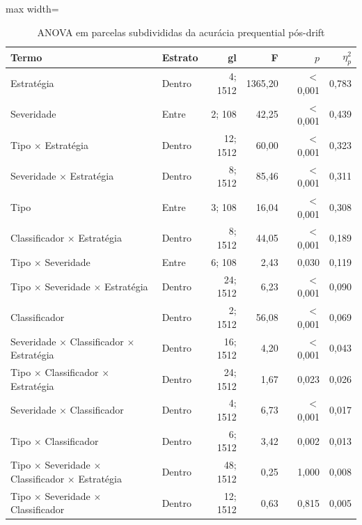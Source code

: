 \begin{table}[htbp]
\centering
\small
\caption{ANOVA em parcelas subdivididas da acurácia prequential pós-drift}
\label{tab:anova}
\begin{adjustbox}{max width=\textwidth}
\begin{tabular}{llrrrr}
\toprule
Termo & Estrato & gl & F & $p$ & $\eta^2_p$ \\
\midrule
Estratégia & Dentro & 4; 1512 & 1365,20 & $<$ 0,001 & 0,783 \\
Severidade & Entre & 2; 108 & 42,25 & $<$ 0,001 & 0,439 \\
Tipo $\times$ Estratégia & Dentro & 12; 1512 & 60,00 & $<$ 0,001 & 0,323 \\
Severidade $\times$ Estratégia & Dentro & 8; 1512 & 85,46 & $<$ 0,001 & 0,311 \\
Tipo & Entre & 3; 108 & 16,04 & $<$ 0,001 & 0,308 \\
Classificador $\times$ Estratégia & Dentro & 8; 1512 & 44,05 & $<$ 0,001 & 0,189 \\
Tipo $\times$ Severidade & Entre & 6; 108 & 2,43 & 0,030 & 0,119 \\
Tipo $\times$ Severidade $\times$ Estratégia & Dentro & 24; 1512 & 6,23 & $<$ 0,001 & 0,090 \\
Classificador & Dentro & 2; 1512 & 56,08 & $<$ 0,001 & 0,069 \\
Severidade $\times$ Classificador $\times$ Estratégia & Dentro & 16; 1512 & 4,20 & $<$ 0,001 & 0,043 \\
Tipo $\times$ Classificador $\times$ Estratégia & Dentro & 24; 1512 & 1,67 & 0,023 & 0,026 \\
Severidade $\times$ Classificador & Dentro & 4; 1512 & 6,73 & $<$ 0,001 & 0,017 \\
Tipo $\times$ Classificador & Dentro & 6; 1512 & 3,42 & 0,002 & 0,013 \\
Tipo $\times$ Severidade $\times$ Classificador $\times$ Estratégia & Dentro & 48; 1512 & 0,25 & 1,000 & 0,008 \\
Tipo $\times$ Severidade $\times$ Classificador & Dentro & 12; 1512 & 0,63 & 0,815 & 0,005 \\
\bottomrule
\end{tabular}
\end{adjustbox}
\par\vspace{2pt}{\footnotesize gl: graus de liberdade do efeito e do erro. Entre: efeitos testados contra a variação entre streams (120 streams); dentro: contra a variação residual dentro das streams.}
\end{table}
